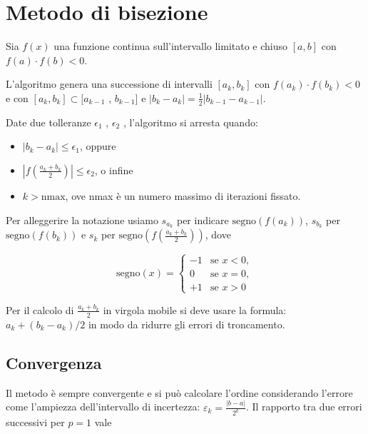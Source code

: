 \section{Metodo di bisezione}

Sia $f (x)$ una funzione continua sull'intervallo limitato e chiuso $[a, b]$ con $f (a) \cdot f (b) < 0$.

L'algoritmo genera una successione di intervalli
$[a_k , b_k]$ con $f (a_k ) \cdot f (b_k ) < 0$ e con $[a_k , b_k ] \subset [a_{k-1}$ , $b_{k-1} ]$ e $|b_k - a_k | = \frac{1}{2}|b_{k-1} - a_{k-1} |$. 

Date due tolleranze $\epsilon_1$ , $\epsilon_2$ , l’algoritmo si arresta quando:

\begin{itemize}
    \item $|b_k - a_k | \leq \epsilon_1$, oppure
    \item $|f (\frac {a_k +b_k}{2} )| \leq \epsilon_2$, o infine
    \item $k > \text{nmax}$, ove nmax è un numero massimo di iterazioni fissato.
\end{itemize}

Per alleggerire la notazione usiamo $s_{a_k}$ per indicare $\mathrm{segno} \left(f\left(a_k\right)\right)$,
$s_{b_k}$ per $\mathrm{segno}(f(b_k))$ e
$s_k$ per $\mathrm{segno}(f (\frac {a_k +b_k}{2}))$, dove

\begin{equation}
    \mathrm{segno}(x) =
    \begin{cases}
        -1 & \text{se } x < 0, \\
         0 & \text{{se }} x = 0, \\
        +1 & \text{{se }} x > 0
    \end{cases}
\end{equation}

Per il calcolo di $\frac{a_k+b_k}{2}$ in virgola mobile si deve usare la formula: $a_k + (b_k - a_k) / 2$ in modo da ridurre gli errori di troncamento.

\subsection{Convergenza}

Il metodo è sempre convergente e si può calcolare l'ordine considerando l'errore
come l'ampiezza dell'intervallo di incertezza: $\varepsilon_k = \frac{|b - a|}{2^k}$.
Il rapporto tra due errori successivi per $p=1$ vale

